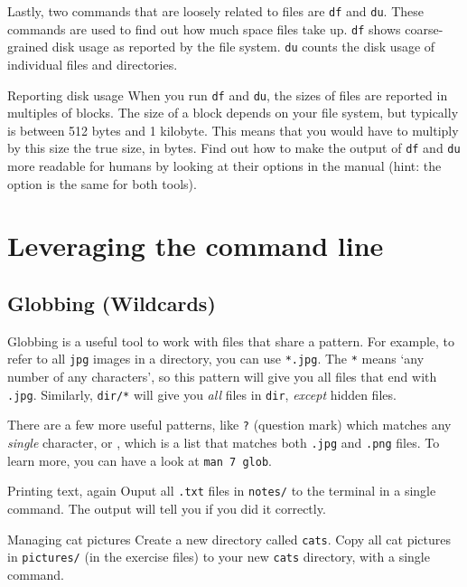 \documentclass{TheAlternativeCourse}
\begin{document}
Lastly, two commands that are loosely related to files are \texttt{df} and
\texttt{du}. These commands are used to find out how much space files take up.
\texttt{df} shows coarse-grained disk usage as reported by the file system.
\texttt{du} counts the disk usage of individual files and directories.

\begin{exercisebox}{Reporting disk usage}
    When you run \texttt{df} and \texttt{du}, the sizes of files are reported
    in multiples of blocks. The size of a block depends on your file system,
    but typically is between 512 bytes and 1 kilobyte. This means that you
    would have to multiply by this size the true size, in bytes. Find out how
    to make the output of \texttt{df} and \texttt{du} more readable for humans
    by looking at their options in the manual (hint: the option is the same for
    both tools).
\end{exercisebox}

\section{Leveraging the command line}

\subsection{Globbing (Wildcards)}

Globbing is a useful tool to work with files that share a pattern. For example,
to refer to all \texttt{jpg} images in a directory, you can use \texttt{*.jpg}.
The \texttt{*} means `any number of any characters', so this pattern will give
you all files that end with \texttt{.jpg}. Similarly, \texttt{dir/*} will give
you \emph{all} files in \texttt{dir}, \emph{except} hidden files.

There are a few more useful patterns, like \texttt{?} (question mark) which
matches any \emph{single} character, or \texttt{},
which is a list that matches both \texttt{.jpg} and \texttt{.png} files. To
learn more, you can have a look at \texttt{man 7 glob}.

\begin{exercisebox}{{Printing text, again}}
    Ouput all \texttt{.txt} files in \texttt{notes/} to the terminal in
    a single command. The output will tell you if you did it correctly.
\end{exercisebox}

\begin{exercisebox}{Managing cat pictures}
    Create a new directory called \texttt{cats}. Copy all cat pictures in
    \texttt{pictures/} (in the exercise files) to your new \texttt{cats}
    directory, with a single command.
\end{exercisebox}
\end{document}

